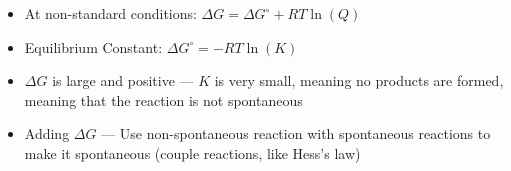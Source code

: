 \documentclass[12pt]{article}
\begin{document}
\begin{itemize}
  \item At non-standard conditions: $\Delta G=\Delta G^{\circ} + RT\ln(Q)$

  \item Equilibrium Constant: $\Delta G^{\circ}=-RT\ln(K)$

  \item $\Delta G$ is large and positive — $K$ is very small, meaning no products are formed, meaning that the reaction is not spontaneous

  \item Adding $\Delta G$ — Use non-spontaneous reaction with spontaneous reactions to make it spontaneous (couple reactions, like Hess's law)

\end{itemize}
\end{document}
